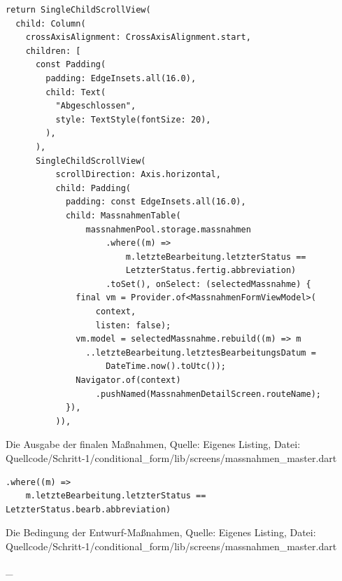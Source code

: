     \begin{listing}[htbp]
        \begin{verbatim}
return SingleChildScrollView(
  child: Column(
    crossAxisAlignment: CrossAxisAlignment.start,
    children: [
      const Padding(
        padding: EdgeInsets.all(16.0),
        child: Text(
          "Abgeschlossen",
          style: TextStyle(fontSize: 20),
        ),
      ),
      SingleChildScrollView(
          scrollDirection: Axis.horizontal,
          child: Padding(
            padding: const EdgeInsets.all(16.0),
            child: MassnahmenTable(
                massnahmenPool.storage.massnahmen
                    .where((m) =>
                        m.letzteBearbeitung.letzterStatus ==
                        LetzterStatus.fertig.abbreviation)
                    .toSet(), onSelect: (selectedMassnahme) {
              final vm = Provider.of<MassnahmenFormViewModel>(
                  context,
                  listen: false);
              vm.model = selectedMassnahme.rebuild((m) => m
                ..letzteBearbeitung.letztesBearbeitungsDatum =
                    DateTime.now().toUtc());
              Navigator.of(context)
                  .pushNamed(MassnahmenDetailScreen.routeName);
            }),
          )),
        \end{verbatim}
\caption[Schritt 1 Ausgabe der finalen Maßnahmen]{Die Ausgabe der finalen Maßnahmen, Quelle: Eigenes Listing, \newline Datei: Quellcode/Schritt-1/conditional_form/lib/screens/massnahmen_master.dart}

\label{lst:Schritt1AusgabeDerFinalenMaßnahmen}
\end{listing}


\begin{listing}[htbp]
    \begin{verbatim}
.where((m) =>
    m.letzteBearbeitung.letzterStatus == LetzterStatus.bearb.abbreviation)
\end{verbatim}
\caption[Schritt 1 Bedingung der Entwurf-Maßnahmen]{Die Bedingung der Entwurf-Maßnahmen, Quelle: Eigenes Listing, \newline Datei: Quellcode/Schritt-1/conditional_form/lib/screens/massnahmen_master.dart}
\label{lst:Schritt1BedingungDerEntwurfMaßnahmen}
\end{listing}



    

_